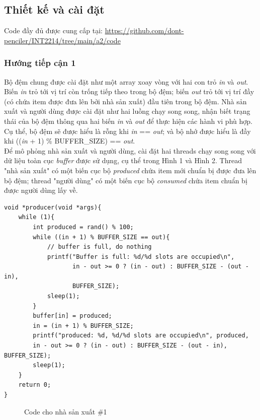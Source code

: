 \documentclass{article}
\begin{document}
\subsection{Thiết kế và cài đặt}
Code đầy đủ được cung cấp tại: \url{https://github.com/dont-penciler/INT2214/tree/main/a2/code}
\subsubsection{Hướng tiếp cận 1}

Bộ đệm chung được cài đặt như một array xoay vòng với hai con trỏ \textit{in} và
\textit{out}. Biến \textit{in} trỏ tới vị trí còn trống tiếp theo trong bộ đệm;
biến \textit{out} trỏ tới vị trí đầy (có chứa item được đưa lên bởi nhà sản xuất)
đầu tiên trong bộ đệm. Nhà sản xuất và người dùng được cài đặt như hai luồng chạy
song song, nhận biết trạng thái của bộ đệm thông qua hai biến \textit{in} và \textit{out}
để thực hiện các hành vi phù hợp. Cụ thể, bộ đệm sẽ được hiểu là rỗng khi \textit{in}
== \textit{out}; và bộ nhớ được hiểu là đầy khi ((\textit{in} + 1) \% BUFFER\_SIZE)
== \textit{out}. \\

Để mô phỏng nhà sản xuất và người dùng, cài đặt hai threads chạy song song với
dữ liệu toàn cục \textit{buffer} được sử dụng, cụ thể trong Hình 1 và Hình 2.
Thread "nhà sản xuất" có một biến cục bộ \textit{produced} chứa item mới chuẩn bị
được đưa lên bộ đệm; thread "người dùng" có một biến cục bộ \textit{consumed} chứa
item chuẩn bị được người dùng lấy về.

\pagebreak

\begin{shaded}
    \begin{lstlisting}
void *producer(void *args){
    while (1){
        int produced = rand() % 100;
        while ((in + 1) % BUFFER_SIZE == out){
            // buffer is full, do nothing
            printf("Buffer is full: %d/%d slots are occupied\n",
                   in - out >= 0 ? (in - out) : BUFFER_SIZE - (out - in), 
                   BUFFER_SIZE);
            sleep(1);
        }
        buffer[in] = produced;
        in = (in + 1) % BUFFER_SIZE; 
        printf("produced: %d, %d/%d slots are occupied\n", produced, 
        in - out >= 0 ? (in - out) : BUFFER_SIZE - (out - in), BUFFER_SIZE);
        sleep(1);
    }
    return 0;
}
    \end{lstlisting}
\end{shaded}

\begin{figure}[h]
    \centering
    \caption{Code cho nhà sản xuất \#1}
\end{figure}
\end{document}
